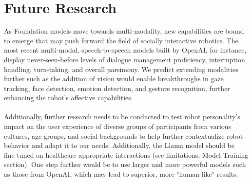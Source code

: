 \documentclass[runningheads]{llncs}
\begin{document}
\section{Future Research}

As Foundation models move towards multi-modality, new capabilities are bound to emerge that may push forward the field of socially interactive robotics. The most recent multi-modal, speech-to-speech models built by OpenAI, for instance, display never-seen-before levels of dialogue management proficiency, interruption handling, turn-taking, and overall parsimony. We predict extending modalities further such as the addition of vision would enable breakthroughs in gaze tracking, face detection, emotion detection, and gesture recognition, further enhancing the robot's affective capabilities. 
\\\\
Additionally, further research needs to be conducted to test robot personality's impact on the user experience of diverse groups of participants from various cultures, age groups, and social backgrounds to help further contextualize robot behavior and adapt it to our needs. Additionally, the Llama model should be fine-tuned on healthcare-appropriate interactions (see limitations, Model Training section). One step further would be to use larger and more powerful models such as those from OpenAI, which may lead to superior, more "human-like" results.
\end{document}
